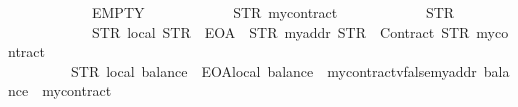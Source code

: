 \begin{isabellebody}
\ \ \ \ \ \ \ \ \ \ \ \ EMPTY\isanewline
\ \ \ \ \ \ \ \ \ \ \ \ {\isacharparenleft}{\kern0pt}STR\ {\isacharprime}{\kern0pt}{\isacharprime}{\kern0pt}mycontract{\isacharprime}{\kern0pt}{\isacharprime}{\kern0pt}{\isacharparenright}{\kern0pt}\isanewline
\ \ \ \ \ \ \ \ \ \ \ \ {\isacharparenleft}{\kern0pt}STR\ {\isacharprime}{\kern0pt}{\isacharprime}{\kern0pt}{}{\isacharprime}{\kern0pt}{\isacharprime}{\kern0pt}{\isacharparenright}{\kern0pt}\isanewline
\ \ \ \ \ \ \ \ \ \ \ \ {\isacharbrackleft}{\kern0pt}{\isacharparenleft}{\kern0pt}STR\ {\isacharprime}{\kern0pt}{\isacharprime}{\kern0pt}local{\isacharprime}{\kern0pt}{\isacharprime}{\kern0pt}{\isacharcomma}{\kern0pt}\ STR\ {\isacharprime}{\kern0pt}{\isacharprime}{\kern0pt}{}{}{}{\isacharprime}{\kern0pt}{\isacharprime}{\kern0pt}{\isacharcomma}{\kern0pt}\ EOA{\isacharcomma}{\kern0pt}\ {}{\isacharparenright}{\kern0pt}{\isacharcomma}{\kern0pt}\ {\isacharparenleft}{\kern0pt}STR\ {\isacharprime}{\kern0pt}{\isacharprime}{\kern0pt}myaddr{\isacharprime}{\kern0pt}{\isacharprime}{\kern0pt}{\isacharcomma}{\kern0pt}\ STR\ {\isacharprime}{\kern0pt}{\isacharprime}{\kern0pt}{}{}{}{\isacharprime}{\kern0pt}{\isacharprime}{\kern0pt}{\isacharcomma}{\kern0pt}\ Contract\ {\isacharparenleft}{\kern0pt}STR\ {\isacharprime}{\kern0pt}{\isacharprime}{\kern0pt}mycontract{\isacharprime}{\kern0pt}{\isacharprime}{\kern0pt}{\isacharparenright}{\kern0pt}{\isacharcomma}{\kern0pt}\ {}{\isacharparenright}{\kern0pt}{\isacharbrackright}{\kern0pt}\isanewline
\ \ \ \ \ \ \ \ \ \ \ \ {\isacharbrackleft}{\kern0pt}{\isacharbrackright}{\kern0pt}\isanewline
\ \ \ \ \ \ \ \ {\isacharequal}{\kern0pt}\ STR\ {\isacharprime}{\kern0pt}{\isacharprime}{\kern0pt}local{\isacharcolon}{\kern0pt}\ balance{\isacharequal}{\kern0pt}{\isacharequal}{\kern0pt}{}{}\ {\isacharminus}{\kern0pt}\ EOA{\isasymnewline}{}{\isachardot}{\kern0pt}local{\isacharcolon}{\kern0pt}\ balance{\isacharequal}{\kern0pt}{\isacharequal}{\kern0pt}{}{}\ {\isacharminus}{\kern0pt}\ mycontract{\isacharparenleft}{\kern0pt}v{}{\isacharequal}{\kern0pt}{\isacharequal}{\kern0pt}false{\isasymnewline}{\isacharparenright}{\kern0pt}{\isasymnewline}myaddr{\isacharcolon}{\kern0pt}\ balance{\isacharequal}{\kern0pt}{\isacharequal}{\kern0pt}{}{}{}\ {\isacharminus}{\kern0pt}\ mycontract{\isacharparenleft}{\kern0pt}{\isacharparenright}{\kern0pt}{\isacharprime}{\kern0pt}{\isacharprime}{\kern0pt}{\isachardoublequoteclose}\isanewline

\end{isabellebody}
